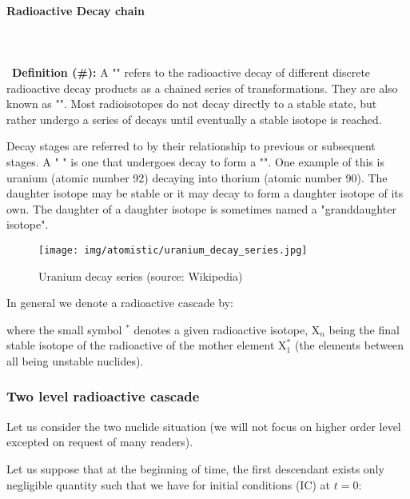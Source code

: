 	\pagebreak
	\paragraph{Radioactive Decay chain}\mbox{}\\\\\
	 \textbf{Definition (\#\mydef):} A "" refers to the radioactive decay of different discrete radioactive decay products as a chained series of transformations. They are also known as "". Most radioisotopes do not decay directly to a stable state, but rather undergo a series of decays until eventually a stable isotope is reached.

	Decay stages are referred to by their relationship to previous or subsequent stages. A " " is one that undergoes decay to form a "". One example of this is uranium (atomic number 92) decaying into thorium (atomic number 90). The daughter isotope may be stable or it may decay to form a daughter isotope of its own. The daughter of a daughter isotope is sometimes named a "granddaughter isotope".
	
	\begin{figure}[H]
		\begin{center}
		\texttt{[image: img/atomistic/uranium\_decay\_series.jpg]}
		\end{center}	
		\caption[Uranium decay series]{Uranium decay series (source: Wikipedia)}
	\end{figure}
	
	In general we denote a radioactive cascade by:
	
	where the small symbol $^{*}$ denotes a given radioactive isotope, $\mathrm{X}_n$ being the final stable isotope of the radioactive of the mother element $\mathrm{X}_1^{*}$ (the elements between all being unstable nuclides).
	
	\subsubsection{Two level radioactive cascade}
	Let us consider the two nuclide situation (we will not focus on higher order level excepted on request of many readers). 

	Let us suppose that at the beginning of time, the first descendant exists only negligible quantity such that we have for initial conditions (IC) at $t=0$:
	
